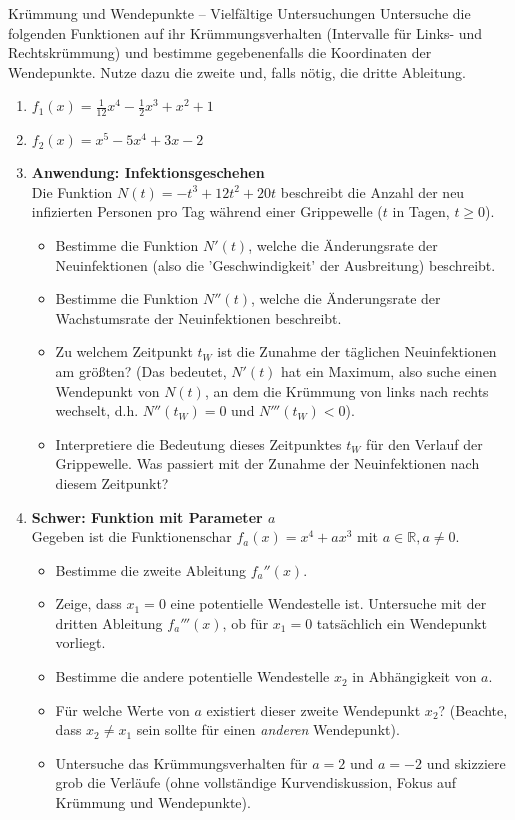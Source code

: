 \begin{aufgabenumgebung}{Krümmung und Wendepunkte – Vielfältige Untersuchungen}
Untersuche die folgenden Funktionen auf ihr Krümmungsverhalten (Intervalle für Links- und Rechtskrümmung) und bestimme gegebenenfalls die Koordinaten der Wendepunkte. Nutze dazu die zweite und, falls nötig, die dritte Ableitung.
\begin{enumerate}
    \item $f_1(x) = \frac{1}{12}x^4 - \frac{1}{2}x^3 + x^2 + 1$
    \item $f_2(x) = x^5 - 5x^4 + 3x - 2$


    \item \textbf{Anwendung: Infektionsgeschehen} \\
        Die Funktion $N(t) = -t^3 + 12t^2 + 20t$ beschreibt die Anzahl der neu infizierten Personen pro Tag während einer Grippewelle ($t$ in Tagen, $t \ge 0$).
        \begin{itemize}
            \item Bestimme die Funktion $N'(t)$, welche die Änderungsrate der Neuinfektionen (also die 'Geschwindigkeit' der Ausbreitung) beschreibt.
            \item Bestimme die Funktion $N''(t)$, welche die Änderungsrate der Wachstumsrate der Neuinfektionen beschreibt.
            \item Zu welchem Zeitpunkt $t_W$ ist die Zunahme der täglichen Neuinfektionen am größten? (Das bedeutet, $N'(t)$ hat ein Maximum, also suche einen Wendepunkt von $N(t)$, an dem die Krümmung von links nach rechts wechselt, d.h. $N''(t_W)=0$ und $N'''(t_W)<0$).
            \item Interpretiere die Bedeutung dieses Zeitpunktes $t_W$ für den Verlauf der Grippewelle. Was passiert mit der Zunahme der Neuinfektionen nach diesem Zeitpunkt?
        \end{itemize}

    \item \textbf{Schwer: Funktion mit Parameter $a$} \\
        Gegeben ist die Funktionenschar $f_a(x) = x^4 + ax^3$ mit $a \in \mathbb{R}, a \neq 0$.
        \begin{itemize}
            \item Bestimme die zweite Ableitung $f_a''(x)$.
            \item Zeige, dass $x_1=0$ eine potentielle Wendestelle ist. Untersuche mit der dritten Ableitung $f_a'''(x)$, ob für $x_1=0$ tatsächlich ein Wendepunkt vorliegt.
            \item Bestimme die andere potentielle Wendestelle $x_2$ in Abhängigkeit von $a$.
            \item Für welche Werte von $a$ existiert dieser zweite Wendepunkt $x_2$? (Beachte, dass $x_2 \neq x_1$ sein sollte für einen \textit{anderen} Wendepunkt).
            \item Untersuche das Krümmungsverhalten für $a=2$ und $a=-2$ und skizziere grob die Verläufe (ohne vollständige Kurvendiskussion, Fokus auf Krümmung und Wendepunkte).
        \end{itemize}
\end{enumerate}
\end{aufgabenumgebung}


